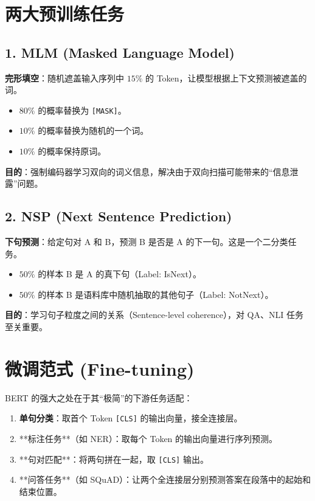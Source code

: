 \documentclass[12pt, a4paper]{book}
\begin{document}
\section{两大预训练任务}

\subsection{1. MLM (Masked Language Model)}
\textbf{完形填空}：随机遮盖输入序列中 $15\%$ 的 Token，让模型根据上下文预测被遮盖的词。
\begin{itemize}
    \item $80\%$ 的概率替换为 \texttt{[MASK]}。
    \item $10\%$ 的概率替换为随机的一个词。
    \item $10\%$ 的概率保持原词。
\end{itemize}
\textbf{目的}：强制编码器学习双向的词义信息，解决由于双向扫描可能带来的“信息泄露”问题。

\subsection{2. NSP (Next Sentence Prediction)}
\textbf{下句预测}：给定句对 A 和 B，预测 B 是否是 A 的下一句。这是一个二分类任务。
\begin{itemize}
    \item $50\%$ 的样本 B 是 A 的真下句（Label: IsNext）。
    \item $50\%$ 的样本 B 是语料库中随机抽取的其他句子（Label: NotNext）。
\end{itemize}
\textbf{目的}：学习句子粒度之间的关系（Sentence-level coherence），对 QA、NLI 任务至关重要。

\section{微调范式 (Fine-tuning)}
BERT 的强大之处在于其“极简”的下游任务适配：
\begin{enumerate}
    \item \textbf{单句分类}：取首个 Token \texttt{[CLS]} 的输出向量，接全连接层。
    \item **标注任务**（如 NER）：取每个 Token 的输出向量进行序列预测。
    \item **句对匹配**：将两句拼在一起，取 \texttt{[CLS]} 输出。
    \item **问答任务**（如 SQuAD）：让两个全连接层分别预测答案在段落中的起始和结束位置。
\end{enumerate}
\end{document}
